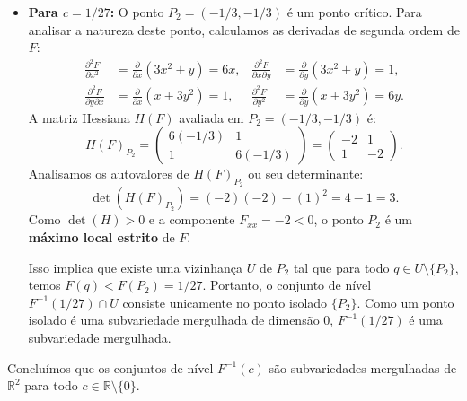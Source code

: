 {\begin{itemize}
		\item \textbf{Para $c = 1/27$:} O ponto $P_2 = (-1/3, -1/3)$ é um ponto crítico. Para analisar a natureza deste ponto, calculamos as derivadas de segunda ordem de $F$:
		\begin{align*}
			\tfrac{\partial^2 F}{\partial x^2} &= \tfrac{\partial}{\partial x}(3x^2 + y) = 6x, & \tfrac{\partial^2 F}{\partial x \partial y} &= \tfrac{\partial}{\partial y}(3x^2 + y) = 1, \\
			\tfrac{\partial^2 F}{\partial y \partial x} &= \tfrac{\partial}{\partial x}(x + 3y^2) = 1, & \tfrac{\partial^2 F}{\partial y^2} &= \tfrac{\partial}{\partial y}(x + 3y^2) = 6y.
		\end{align*}
		A matriz Hessiana $H(F)$ avaliada em $P_2 = (-1/3, -1/3)$ é:
		\begin{equation*}
			H(F)_{P_2} = \begin{pmatrix} 6(-1/3) & 1 \\ 1 & 6(-1/3) \end{pmatrix} = \begin{pmatrix} -2 & 1 \\ 1 & -2 \end{pmatrix}.
		\end{equation*}
		Analisamos os autovalores de $H(F)_{P_2}$ ou seu determinante:
		\begin{equation*}
			\det(H(F)_{P_2}) = (-2)(-2) - (1)^2 = 4 - 1 = 3.
		\end{equation*}
		Como $\det(H) > 0$ e a componente $F_{xx} = -2 < 0$, o ponto $P_2$ é um \textbf{máximo local estrito} de $F$. 
		
		Isso implica que existe uma vizinhança $U$ de $P_2$ tal que para todo $q \in U \setminus \{P_2\}$, temos $F(q) < F(P_2) = 1/27$. Portanto, o conjunto de nível $F^{-1}(1/27) \cap U$ consiste unicamente no ponto isolado $\{P_2\}$. Como um ponto isolado é uma subvariedade mergulhada de dimensão 0, $F^{-1}(1/27)$ é uma subvariedade mergulhada.
	\end{itemize}
	
	Concluímos que os conjuntos de nível $F^{-1}(c)$ são subvariedades mergulhadas de $\mathbb{R}^2$ para todo $c \in \mathbb{R} \setminus \{0\}$.
	\begin{center}
\end{center}}
